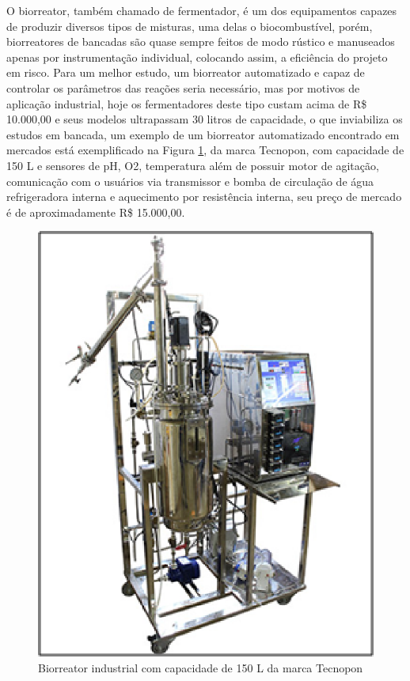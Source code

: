 O biorreator, também chamado de fermentador, é um dos equipamentos capazes de produzir diversos tipos de misturas, uma delas o biocombustível, porém, biorreatores de bancadas são quase sempre feitos de modo rústico e manuseados apenas por instrumentação individual, colocando assim, a eficiência do projeto em risco. Para um melhor estudo, um biorreator automatizado e capaz de controlar os parâmetros das reações seria necessário, mas por motivos de aplicação industrial, hoje os fermentadores deste tipo custam acima de R\$ 10.000,00 e seus modelos ultrapassam 30 litros de capacidade, o que inviabiliza os estudos em bancada, um exemplo de um biorreator automatizado encontrado em mercados está exemplificado na Figura \ref{tecnopon}, da marca Tecnopon, com capacidade de 150 L e sensores de pH, O2, temperatura além de possuir motor de agitação, comunicação com o usuários via transmissor e bomba de circulação de água refrigeradora interna e aquecimento por resistência interna, seu preço de mercado é de aproximadamente R\$ 15.000,00.

\begin{figure}[h]
	\centering
	\includegraphics[keepaspectratio=true,scale=0.8]{figuras/tecnopon.eps}
	\caption{Biorreator industrial com capacidade de 150 L da marca Tecnopon}
	\label{tecnopon}
\end{figure}


